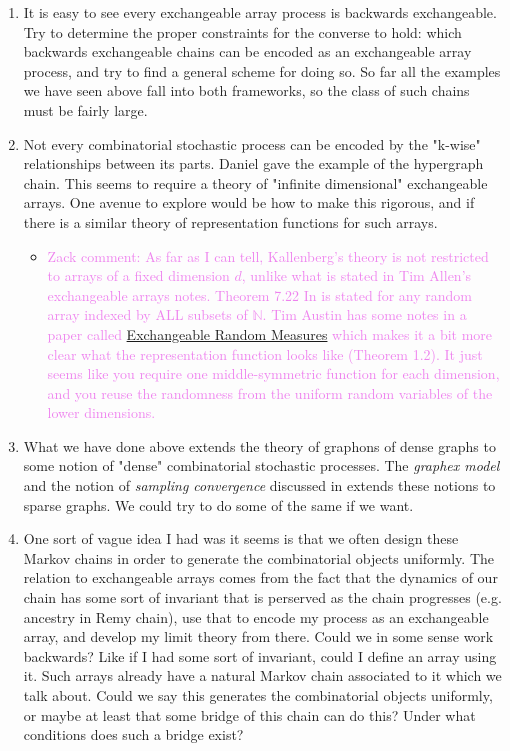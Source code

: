\documentclass[11pt,oneside,reqno]{article}
\theoremstyle{plain}
\theoremstyle{definition}
\numberwithin{equation}{section}
\renewcommand{\cite}{\citet}
\newcommand{\N}{\mathbb{N}}
\newcommand{\zack}[1]{\textcolor{Violet}{Zack comment: #1}}
\begin{document}
\begin{enumerate}
    \item It is easy to see every exchangeable array process is backwards exchangeable. Try to determine the proper constraints for the converse to hold: which backwards exchangeable chains can be encoded as an exchangeable array process, and try to find a general scheme for doing so. So far all the examples we have seen above fall into both frameworks, so the class of such chains must be fairly large.

    \item Not every combinatorial stochastic process can be encoded by the "k-wise" relationships between its parts. Daniel gave the example of the hypergraph chain. This seems to require a theory of "infinite dimensional" exchangeable arrays. One avenue to explore would be how to make this rigorous, and if there is a similar theory of representation functions for such arrays.

    \begin{itemize}
        \item \zack{As far as I can tell, Kallenberg's theory is not restricted to arrays of a fixed dimension $d$, unlike what is stated in Tim Allen's exchangeable arrays notes. Theorem 7.22 In \cite{KallenbergProbabilisticSymmetries} is stated for any random array indexed by ALL subsets of $\N$. Tim Austin has some notes in a paper called \href{https://arxiv.org/abs/1302.2116}{Exchangeable Random Measures} which makes it a bit more clear what the representation function looks like (Theorem 1.2). It just seems like you require one middle-symmetric function for each dimension, and you reuse the randomness from the uniform random variables of the lower dimensions.}
    \end{itemize}

    \item What we have done above extends the theory of graphons of dense graphs to some notion of "dense" combinatorial stochastic processes. The \textit{graphex model} and the notion of \textit{sampling convergence} discussed in \cite{Borgs_2019_Sampling_convergence_sparse_graphs} extends these notions to sparse graphs. We could try to do some of the same if we want.

    \item One sort of vague idea I had was it seems is that we often design these Markov chains in order to generate the combinatorial objects uniformly. The relation to exchangeable arrays comes from the fact that the dynamics of our chain has some sort of invariant that is perserved as the chain progresses (e.g. ancestry in Remy chain), use that to encode my process as an exchangeable array, and develop my limit theory from there. Could we in some sense work backwards? Like if I had some sort of invariant, could I define an array using it. Such arrays already have a natural Markov chain associated to it which we talk about. Could we say this generates the combinatorial objects uniformly, or maybe at least that some bridge of this chain can do this? Under what conditions does such a bridge exist?


\end{enumerate}
\end{document}
